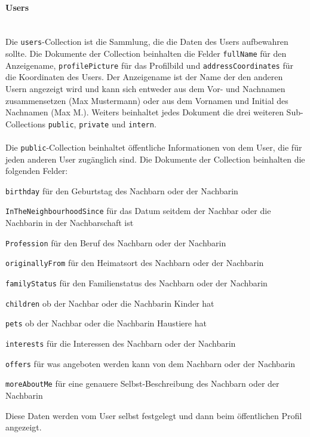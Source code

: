 \paragraph{Users}\mbox{} \\
Die \texttt{users}-Collection ist die Sammlung, die die Daten des Users aufbewahren sollte. Die Dokumente der Collection beinhalten die Felder \texttt{fullName} für den Anzeigename, \texttt{profilePicture} für das Profilbild und \texttt{addressCoordinates} für die Koordinaten des Users. Der Anzeigename ist der Name der den anderen Usern angezeigt wird und kann sich entweder aus dem Vor- und Nachnamen zusammensetzen (Max Mustermann) oder aus dem Vornamen und Initial des Nachnamen (Max M.). Weiters beinhaltet jedes Dokument die drei weiteren Sub-Collections \texttt{public}, \texttt{private} und \texttt{intern}.
\\\\
Die \texttt{public}-Collection beinhaltet öffentliche Informationen von dem User, die für jeden anderen User zugänglich sind. Die Dokumente der Collection beinhalten die folgenden Felder:
\begin{compactitem}
  \item \texttt{birthday} für den Geburtstag des Nachbarn oder der Nachbarin
  \item \texttt{InTheNeighbourhoodSince} für das Datum seitdem der Nachbar oder die Nachbarin in der Nachbarschaft ist
  \item \texttt{Profession} für den Beruf des Nachbarn oder der Nachbarin
  \item \texttt{originallyFrom} für den Heimatsort des Nachbarn oder der Nachbarin
  \item \texttt{familyStatus} für den Familienstatus des Nachbarn oder der Nachbarin
  \item \texttt{children} ob der Nachbar oder die Nachbarin Kinder hat
  \item \texttt{pets} ob der Nachbar oder die Nachbarin Haustiere hat
  \item \texttt{interests} für die Interessen des Nachbarn oder der Nachbarin
  \item \texttt{offers} für was angeboten werden kann von dem Nachbarn oder der Nachbarin
  \item \texttt{moreAboutMe} für eine genauere Selbst-Beschreibung des Nachbarn oder der Nachbarin
\end{compactitem}
Diese Daten werden vom User selbst festgelegt und dann beim öffentlichen Profil angezeigt.
\\\\

